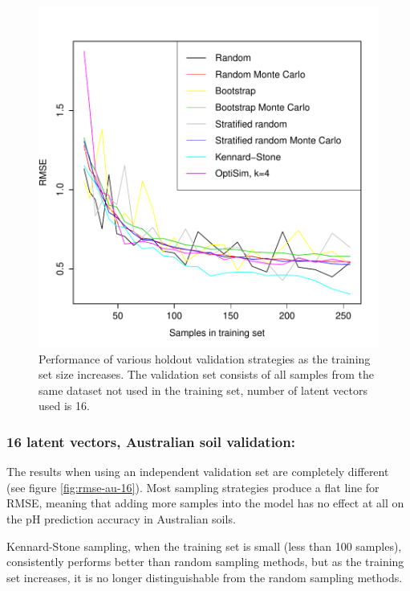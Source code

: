 \documentclass{isprs}
\begin{document}
\begin{figure}[ht!]
\includegraphics[width=1.0\columnwidth]{../script/output/rmse-nl-16.pdf}
\begin{center}
    \caption{Performance of various holdout validation strategies as the training set size increases. The validation set consists of all samples from the same dataset not used in the training set, number of latent vectors used is 16.}
    \label{fig:rmse-nl-16}
\end{center}
\end{figure}

\subsubsection{16 latent vectors, Australian soil validation:}\label{sec:AU16}

The results when using an independent validation set are completely different (see figure \ref{fig:rmse-au-16}). Most sampling strategies produce a flat line for RMSE, meaning that adding more samples into the model has no effect at all on the pH prediction accuracy in Australian soils.

Kennard-Stone sampling, when the training set is small (less than 100 samples), consistently performs better than random sampling methods, but as the training set increases, it is no longer distinguishable from the random sampling methods.
\end{document}
